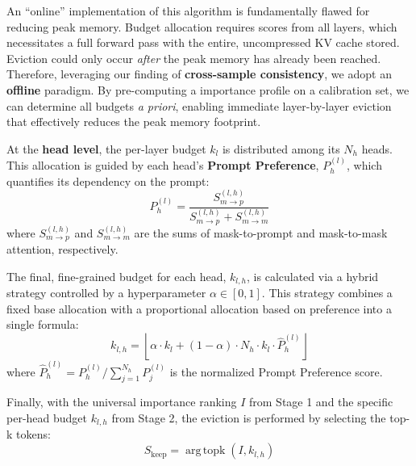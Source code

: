An ``online'' implementation of this algorithm is fundamentally flawed for reducing peak memory. Budget allocation requires scores from all layers, which necessitates a full forward pass with the entire, uncompressed KV cache stored. Eviction could only occur \textit{after} the peak memory has already been reached. Therefore, leveraging our finding of \textbf{cross-sample consistency}, we adopt an \textbf{offline} paradigm. By pre-computing a importance profile on a calibration set, we can determine all budgets \textit{a priori}, enabling immediate layer-by-layer eviction that effectively reduces the peak memory footprint.

At the \textbf{head level}, the per-layer budget $k_l$ is distributed among its $N_h$ heads. This allocation is guided by each head's \textbf{Prompt Preference}, $P_h^{(l)}$, which quantifies its dependency on the prompt:
\begin{equation}
\label{eq:prompt_preference_metric}
    P_h^{(l)} = \frac{S_{m \to p}^{(l,h)}}{S_{m \to p}^{(l,h)} + S_{m \to m}^{(l,h)}}
\end{equation}
where $S_{m \to p}^{(l,h)}$ and $S_{m \to m}^{(l,h)}$ are the sums of mask-to-prompt and mask-to-mask attention, respectively.

The final, fine-grained budget for each head, $k_{l,h}$, is calculated via a hybrid strategy controlled by a hyperparameter $\alpha \in [0,1]$. This strategy combines a fixed base allocation with a proportional allocation based on preference into a single formula:
\begin{equation}
\label{eq:final_head_budget}
    k_{l,h} = \left\lfloor \alpha \cdot k_l + (1-\alpha) \cdot N_h \cdot k_l \cdot \hat{P}_h^{(l)} \right\rfloor
\end{equation}
where $\hat{P}_h^{(l)} = P_h^{(l)} / \sum_{j=1}^{N_h} P_j^{(l)}$ is the normalized Prompt Preference score.

Finally, with the universal importance ranking $I$ from Stage 1 and the specific per-head budget $k_{l,h}$ from Stage 2, the eviction is performed by selecting the top-k tokens:
\begin{equation}
    S_{\text{keep}} = \operatorname{arg\,topk}(I, k_{l,h})
\end{equation}







